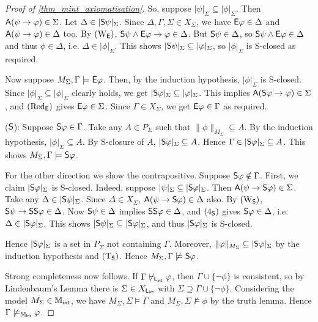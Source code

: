 \begin{proof}[Proof of \cref{thm_mint_axiomatisation}]
So, suppose $|\psi|_\Sigma \subseteq |\phi|_\Sigma$. Then
$\A(\psi \limplies \phi) \in \Sigma$. Let $\Delta \in
|\S\psi|_\Sigma$. Since $\Delta, \Gamma, \Sigma \in X_\Sigma$,
we have $\E\phi \in \Delta$ and $\A(\psi \limplies \phi) \in
\Delta$ too. By $\weakeningE$, $\S\psi \land \E\phi \limplies
\phi \in \Delta$. But $\S\psi \in \Delta$, so $\S\psi \land
\E\phi \in \Delta$ and thus $\phi \in \Delta$, i.e.  $\Delta
\in |\phi|_\Sigma$. This shows $|\S\psi|_\Sigma \subseteq
|\phi|_\Sigma$, so $|\phi|_\Sigma$ is S-closed as required.

Now suppose $M_\Sigma, \Gamma \models \E\phi$. Then, by the
induction hypothesis, $|\phi|_\Sigma$ is S-closed. Since
$|\phi|_\Sigma \subseteq |\phi|_\Sigma$ clearly holds, we get
$|\S\phi|_\Sigma \subseteq |\phi|_\Sigma$. This implies
$\A(\S\phi \limplies \phi) \in \Sigma$, and $\redE$ gives
$\E\phi \in \Sigma$. Since $\Gamma \in X_\Sigma$, we get
$\E\phi \in \Gamma$ as required.

($\S$): Suppose $\S\phi \in \Gamma$. Take any $A \in P_\Sigma$
such that $\|\phi\|_{M_\Sigma} \subseteq A$. By the induction
hypothesis, $|\phi|_\Sigma \subseteq A$. By S-closure of $A$,
$|\S\phi|_\Sigma \subseteq A$. Hence $\Gamma \in
|\S\phi|_\Sigma \subseteq A$. This shows $M_\Sigma, \Gamma
\models \S\phi$.

For the other direction we show the contrapositive. Suppose
$\S\phi \notin \Gamma$. First, we claim $|\S\phi|_\Sigma$ is
S-closed. Indeed, suppose $|\psi|_\Sigma \subseteq
|\S\phi|_\Sigma$. Then $\A(\psi \limplies \S\phi) \in \Sigma$.
Take any $\Delta \in |\S\psi|_\Sigma$. Since $\Delta \in
X_\Sigma$, $\A(\psi \limplies \S\phi) \in \Delta$ also. By
$\weakeningS$, $\S\psi \limplies \S\S\phi \in \Delta$.  Now
$\S\psi \in \Delta$ implies $\S\S\phi \in \Delta$, and
$\foursoundness$ gives $\S\phi \in \Delta$, i.e.  $\Delta \in
|\S\phi|_\Sigma$. This shows $|\S\psi|_\Sigma \subseteq
|\S\phi|_\Sigma$, and thus $|\S\phi|_\Sigma$ is S-closed.

Hence $|\S\phi|_\Sigma$ is a set in $P_\Sigma$ not containing
$\Gamma$. Moreover, $\|\phi\|_{M_\Sigma} \subseteq
|\S\phi|_\Sigma$ by the induction hypothesis and $\Tsoundness$.
Hence $M_\Sigma, \Gamma \not\models \S\phi$.

Strong completeness now follows. If $\Gamma \not\entails_{\sLint} \phi$, then
$\Gamma \cup \{\neg\phi\}$ is consistent, so by Lindenbaum's Lemma
there is $\Sigma \in X_{\sLint}$ with $\Sigma \supseteq \Gamma \cup
\{\neg\phi\}$.  Considering the model $M_\Sigma \in \Mint$, we have
$M_\Sigma, \Sigma \models \Gamma$ and $M_\Sigma, \Sigma \not\models
\phi$ by the truth lemma. Hence $\Gamma \not\models_{\Mint} \phi$.


\end{proof}

